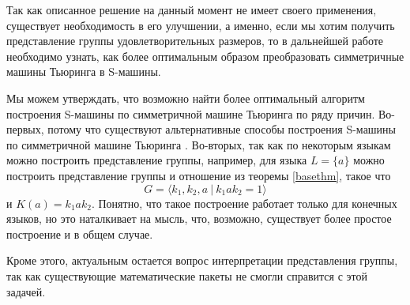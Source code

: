 \documentclass[14pt]{matmex-diploma-custom}
\begin{document}
Так как описанное решение на данный момент не имеет своего применения, существует необходимость в его улучшении, а именно, если мы хотим получить представление группы удовлетворительных размеров, то в дальнейшей работе необходимо узнать, как более оптимальным образом преобразовать симметричные машины Тьюринга в S-машины. 

Мы можем утверждать, что возможно найти более оптимальный алгоритм построения S-машины по симметричной машине Тьюринга по ряду причин.
Во-первых, потому что существуют альтернативные способы построения S-машины по симметричной машине Тьюринга \cite{SpaceFunc}.
Во-вторых, так как по некоторым языкам можно построить представление группы, например, для языка $L = \{a\}$ можно построить представление группы и отношение из теоремы \ref{basethm}, такое что 
$$G=\langle k_1, k_2, a ~|~ k_1 a k_2 = 1 \rangle$$ 
и $K(a) = k_1 a k_2$. Понятно, что такое построение работает только для конечных языков, но это наталкивает на мысль, что, возможно, существует более простое построение и в общем случае. 

Кроме этого, актуальным остается вопрос интерпретации представления группы, так как существующие математические пакеты не смогли справится с этой задачей. 
\end{document}
